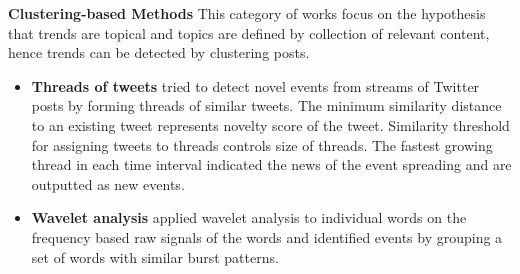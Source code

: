 \documentclass[11pt,a4paper]{article}
\begin{document}
\textbf{Clustering-based Methods} This category of works focus on the hypothesis that trends are topical and topics are defined by collection of relevant content, hence trends can be detected by clustering posts.
\begin{itemize}
\item \textbf{Threads of tweets} \citet{petrovic} tried to detect novel events from streams of Twitter posts by forming threads of similar tweets. The minimum similarity distance to an existing tweet represents novelty score of the tweet. Similarity threshold for assigning tweets to threads controls size of threads. The fastest growing thread in each time interval indicated the news of the event spreading and are outputted as new events. 
\item \textbf{Wavelet analysis} \citet{wangLee} applied wavelet analysis to individual words on the frequency based raw signals of the words and identified events by grouping a set of words with similar burst patterns.
\end{itemize}
\end{document}

